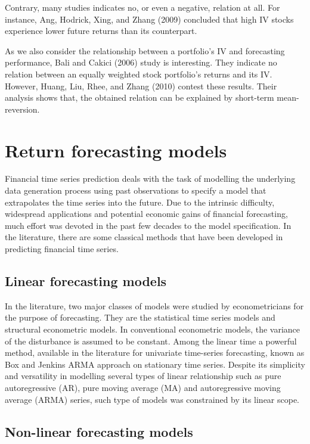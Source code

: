 Contrary, many studies indicates no, or even a negative, relation at all. For instance, Ang, Hodrick, Xing, and Zhang (2009) concluded that high IV stocks experience lower future returns than its counterpart.

As we also consider the relationship between a portfolio's IV and forecasting performance, Bali and Cakici (2006) study is interesting. They indicate no relation between an equally weighted stock portfolio's returns and its IV. However, Huang, Liu, Rhee, and Zhang (2010) contest these results. Their analysis shows that, the obtained relation can be explained by short-term mean-reversion.

\section*{Return forecasting models}

Financial time series prediction deals with the task of modelling the underlying data generation process using past observations to specify a model that extrapolates the time series into the future. Due to the intrinsic difficulty, widespread applications and potential economic gains of financial forecasting, much effort was devoted in the past few decades to the model specification. In the literature, there are some classical methods that have been developed in predicting financial time series. 

\subsection*{Linear forecasting models}

In the literature, two major classes of models were studied by econometricians for the purpose of forecasting. They are the statistical time series models and structural econometric models. In conventional econometric models, the variance of the disturbance is assumed to be constant.  Among the linear time a powerful method, available in the literature for univariate time-series forecasting, known as Box and Jenkins \cite{B&J} ARMA approach on stationary time series. Despite its simplicity and versatility in modelling several types of linear relationship such as pure autoregressive (AR), pure moving average (MA) and autoregressive moving average (ARMA) series, such type of models was constrained by its linear scope. 

\subsection*{Non-linear forecasting models}

